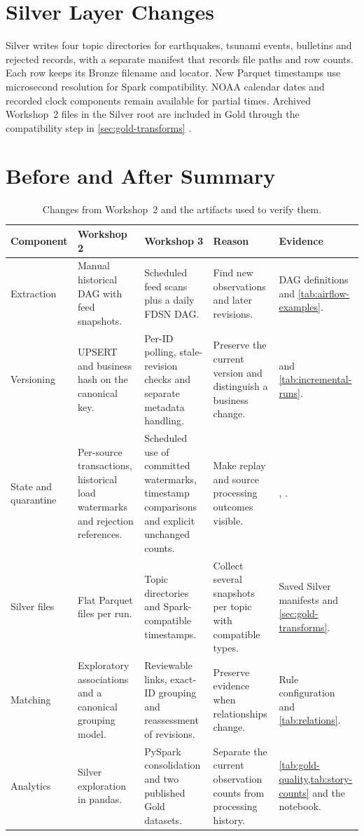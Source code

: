 \documentclass[a4paper,11pt,oneside]{book}
\begin{document}
\section{Silver Layer Changes}
Silver writes four topic directories for earthquakes, tsunami events, bulletins and rejected records, with a separate manifest that records file paths and row counts. Each row keeps its Bronze filename and locator. New Parquet timestamps use microsecond resolution for Spark compatibility. NOAA calendar dates and recorded clock components remain available for partial times. Archived Workshop~2 files in the Silver root are included in Gold through the compatibility step in \cref{sec:gold-transforms} \cite{parquet}.

\section{Before and After Summary}
\begin{table}[!htbp]
\centering
\footnotesize
\begin{tabularx}{\textwidth}{@{}L{1.8cm}YYYY@{}}
\toprule
Component & Workshop 2 & Workshop 3 & Reason & Evidence \\
\midrule
Extraction & Manual historical DAG with feed snapshots. & Scheduled feed scans plus a daily FDSN DAG. & Find new observations and later revisions. & DAG definitions and \cref{tab:airflow-examples}. \\
Versioning & UPSERT and business hash on the canonical key. & Per-ID polling, stale-revision checks and separate metadata handling. & Preserve the current version and distinguish a business change. &  and \cref{tab:incremental-runs}. \\
State and quarantine & Per-source transactions, historical load watermarks and rejection references. & Scheduled use of committed watermarks, timestamp comparisons and explicit unchanged counts. & Make replay and source processing outcomes visible. & , . \\
Silver files & Flat Parquet files per run. & Topic directories and Spark-compatible timestamps. & Collect several snapshots per topic with compatible types. & Saved Silver manifests and \cref{sec:gold-transforms}. \\
Matching & Exploratory associations and a canonical grouping model. & Reviewable links, exact-ID grouping and reassessment of revisions. & Preserve evidence when relationships change. & Rule configuration and \cref{tab:relations}. \\
Analytics & Silver exploration in pandas. & PySpark consolidation and two published Gold datasets. & Separate the current observation counts from processing history. & \cref{tab:gold-quality,tab:story-counts} and the notebook. \\
\bottomrule
\end{tabularx}
\caption{Changes from Workshop~2 and the artifacts used to verify them.}
\label{tab:before-after}
\end{table}
\end{document}
